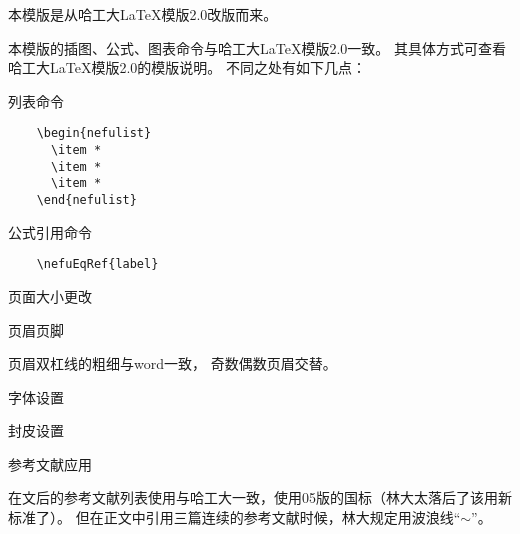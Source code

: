 

本模版是从哈工大\LaTeX 模版2.0改版而来。

本模版的插图、公式、图表命令与哈工大\LaTeX 模版2.0一致。
其具体方式可查看哈工大\LaTeX 模版2.0的模版说明。
不同之处有如下几点：
\begin{nefulist}
  \item 列表命令
  
  \begin{verbatim}
    \begin{nefulist}
      \item *
      \item *
      \item *      
    \end{nefulist}
  \end{verbatim}
  \item 公式引用命令
  
  \begin{verbatim}
    \nefuEqRef{label}
  \end{verbatim}
\end{nefulist}
\begin{nefulist}
  \item 页面大小更改
  \item 页眉页脚  
  
  页眉双杠线的粗细与word一致，
  奇数偶数页眉交替。
  
  \item 字体设置
  \item 封皮设置  
  \item  参考文献应用
  
  在文后的参考文献列表使用与哈工大一致，使用05版的国标（林大太落后了该用新标准了）。
  但在正文中引用三篇连续的参考文献时候，林大规定用波浪线“$\sim$”。
\end{nefulist}

